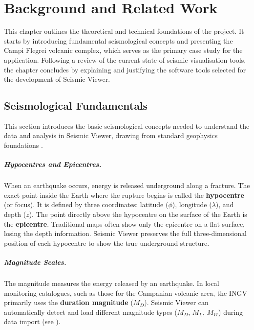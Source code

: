 
\chapter{Background and Related Work}
\label{ch:background}

This chapter outlines the theoretical and technical foundations of the project. It starts by introducing fundamental seismological concepts and presenting the Campi Flegrei volcanic complex, which serves as the primary case study for the application. Following a review of the current state of seismic visualisation tools, the chapter concludes by explaining and justifying the software tools selected for the development of Seismic Viewer.

\section{Seismological Fundamentals}
\label{sec:seismology}

This section introduces the basic seismological concepts needed to understand the data and analysis in Seismic Viewer, drawing from standard geophysics foundations \cite{shearer2019introduction}.

\paragraph{Hypocentres and Epicentres.}
When an earthquake occurs, energy is released underground along a fracture. The exact point inside the Earth where the rupture begins is called the \textbf{hypocentre} (or focus). It is defined by three coordinates: latitude ($\phi$), longitude ($\lambda$), and depth ($z$). The point directly above the hypocentre on the surface of the Earth is the \textbf{epicentre}. Traditional maps often show only the epicentre on a flat surface, losing the depth information. Seismic Viewer preserves the full three-dimensional position of each hypocentre to show the true underground structure.

\paragraph{Magnitude Scales.}
The magnitude measures the energy released by an earthquake. In local monitoring catalogues, such as those for the Campanian volcanic area, the INGV primarily uses the \textbf{duration magnitude} ($M_D$). Seismic Viewer can automatically detect and load different magnitude types ($M_D$, $M_L$, $M_W$) during data import (see ).

